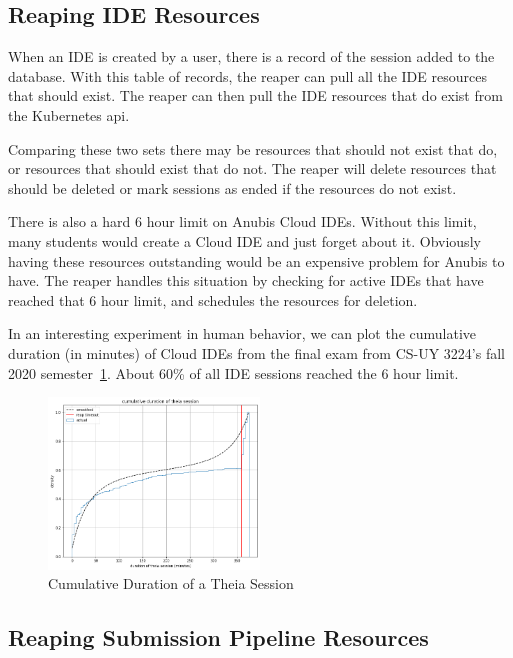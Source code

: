 \subsection{Reaping IDE Resources}\label{subsec:reaping-ide-resources}

When an IDE is created by a user, there is a record of the session added to the database.
With this table of records, the reaper can pull all the IDE resources that should exist.
The reaper can then pull the IDE resources that do exist from the Kubernetes api.

Comparing these two sets there may be resources that should not exist that do, or
resources that should exist that do not.
The reaper will delete resources that should be deleted or mark sessions as ended
if the resources do not exist.

There is also a hard 6 hour limit on Anubis Cloud IDEs.
Without this limit, many students would create a Cloud IDE and just forget about it.
Obviously having these resources outstanding would be an expensive problem for Anubis to have.
The reaper handles this situation by checking for active IDEs that have reached that 6 hour limit,
and schedules the resources for deletion.

In an interesting experiment in human behavior, we can plot the cumulative duration (in minutes) of
Cloud IDEs from the final exam from CS-UY 3224's fall 2020 semester~\ref{fig:theia3}.
About 60\% of all IDE sessions reached the 6 hour limit.

\begin{figure}[ht]
    \centering
    \includegraphics[width=0.5\textwidth]{figures/theia3.png}
    \caption{Cumulative Duration of a Theia Session\label{fig:theia3}}
\end{figure}

\subsection{Reaping Submission Pipeline Resources}\label{subsec:reaping-submission-pipeline-resources}

